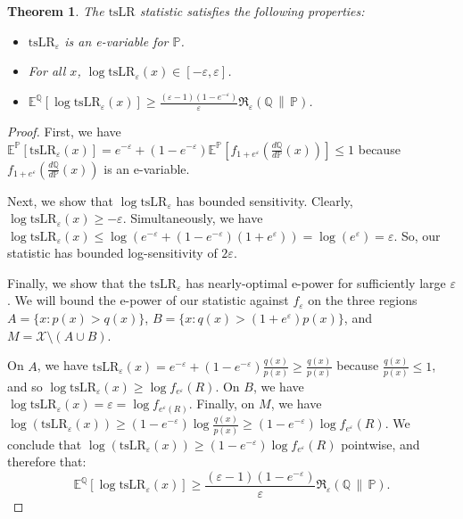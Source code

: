 \documentclass{article}
\newcommand{\Rdiv}[3][\eps]{%
  \mathfrak{R}_{#1}\!\left(#2\,\middle\|\,#3\right)%
}
\newcommand{\Null}{\mathbb{P}}
\newcommand{\E}{\mathbb{E}}
\newcommand{\Alt}{\mathbb{Q}}
\newcommand{\opt}{\Rdiv{\Alt}{\Null}}
\newcommand{\tsllr}{\text{tsLR}}
\newcommand{\eps}{\varepsilon}
\newtheorem{theorem}{Theorem}[section]
\begin{document}
\begin{theorem}\label{thm:tslr}
    The $\tsllr$ statistic satisfies the following properties:
    \begin{itemize}
        \item $\tsllr_\eps$ is an e-variable for $\Null$.
        \item For all $x$, $\log\tsllr_\eps(x) \in [-\varepsilon, \varepsilon]$.
        \item $\E^\Alt[\log \tsllr_\eps(x)] \geq  \frac{(\eps-1)(1-e^{-\varepsilon})}{\eps}\opt$.
    \end{itemize}
\end{theorem}

\begin{proof}
First, we have $\E^\Null[\tsllr_\eps(x)] =e^{-\varepsilon} + (1-e^{-\varepsilon})\E^\Null[f_{1+e^\varepsilon}(\frac{d\Alt}{d\Null}(x))] \leq 1$ because $f_{1+e^\varepsilon}(\frac{d\Alt}{d\Null}(x))$ is an e-variable.
    
Next, we show that $\log\tsllr_\eps$ has bounded sensitivity. Clearly, $\log \tsllr_\eps(x) \geq -\varepsilon$. Simultaneously, we have $\log \tsllr_\eps(x) \leq \log(e^{-\varepsilon} + (1-e^{-\varepsilon})(1+e^\varepsilon)) = \log(e^\varepsilon)=\varepsilon$. So, our statistic has bounded log-sensitivity of $2\varepsilon$.

Finally, we show that the $\tsllr_\eps$ has nearly-optimal e-power for sufficiently large $\eps$. We will bound the e-power of our statistic against $f_\varepsilon$ on the three regions $A = \lbrace x: p(x)>q(x) \rbrace$, $B = \lbrace x:q(x) > (1+e^\varepsilon) p(x) \rbrace$, and $M = \mathcal{X} \setminus (A \cup B)$.

On $A$, we have $\tsllr_\eps(x) = e^{-\varepsilon} + (1-e^{-\varepsilon})\frac{q(x)}{p(x)} \geq \frac{q(x)}{p(x)}$ because $\frac{q(x)}{p(x)} \leq 1$, and so $\log \tsllr_\eps(x) \geq \log f_{e^\varepsilon}(R)$. On $B$, we have $\log \tsllr_\eps(x) = \varepsilon = \log f_{e^\varepsilon(R)}$. Finally, on $M$, we have $\log (\tsllr_\eps(x)) \geq (1-e^{-\varepsilon}) \log \frac{q(x)}{p(x)} \geq (1-e^{-\varepsilon})\log f_{e^{\varepsilon}}(R)$. We conclude that $\log (\tsllr_\eps(x)) \geq (1-e^{-\varepsilon}) \log f_{e^\varepsilon}(R)$ pointwise, and therefore that:
\begin{equation*}
        \E^\Alt[\log \tsllr_\eps(x)] \geq \frac{(\eps-1)(1-e^{-\varepsilon})}{\eps}\opt .
\end{equation*}
\end{proof}
\end{document}
